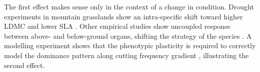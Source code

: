 \begin{figure}
    \classiccaptionstyle
{}
\end{figure}

The first effect makes sense only in the context of a change in condition. Drought experiments in mountain grasslands show an intra-specific shift toward higher LDMC and lower SLA \parencite{jung_intraspecific_2014}. Other empirical studies show uncoupled response between above- and below-ground organs, shifting the strategy of the species \parencite{freschet_plasticity_2013}. A modelling experiment shows that the phenotypic plasticity is required to correctly model the dominance pattern along cutting frequency gradient \parencite{maire_plasticity_2013}, illustrating the second effect. \\




